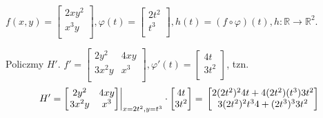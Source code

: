 \documentclass[../main.tex]{subfiles}
\begin{document}
\begin{przyklad}

$f(x,y) = \left [ \begin{matrix}
2xy^2\\
x^3 y\\\end{matrix}\right ],
\varphi(t) = \left [ \begin{matrix}
2t^2\\
t^3\\
\end{matrix}\right ],
h(t) = (f \circ \varphi) (t), h: \mathbb{R}\to \mathbb{R}^2$.

Policzmy $H'$. $f' = \left [ \begin{matrix}
2y^2    &4xy\\
3x^2y   &x^3\\
\end{matrix}\right ], \varphi '(t) = \left [ \begin{matrix}
4t\\
3t^2\\
    \end{matrix}\right ]$, tzn.
    \[
        H' = \left [ \left .\begin{matrix}
2y^2    &4xy\\
3x^2y   &x^3\\
    \end{matrix}\right ]\right |_{x=2t^2, y=t^3} \cdot \left [ \begin{matrix}
4t\\
3t^2\\
\end{matrix}\right ] = \\
\left [ \begin{matrix} 2(2t^2)^2 4t + 4(2t^2)(t^3) 3t^2\\
3(2t^2)^2 t^3 4 + (2t^3)^3 3t^2\\\end{matrix}\right ]
\]
\end{przyklad}
\end{document}

